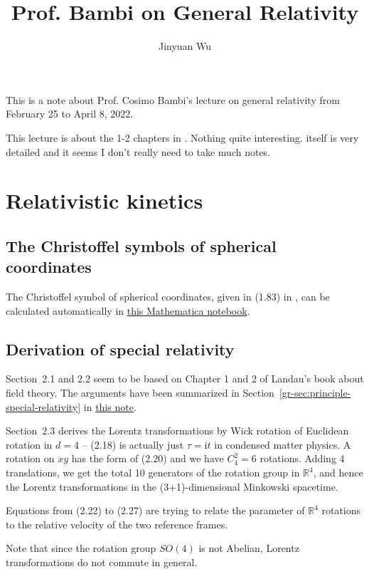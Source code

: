 \documentclass[hyperref, a4paper]{article}
\title{Prof. Bambi on General Relativity}
\author{Jinyuan Wu}
\newcommand*{\ii}{\mathrm{i}}
\newcommand{\grnote}{\href{../relativity/relativistic.pdf}{this note}}
\begin{document}
\maketitle

This is a note about Prof. Cosimo Bambi's lecture on general relativity from February 25 to April 8, 2022.

This lecture is about the 1-2 chapters in \cite{bambi2018introduction}. Nothing quite interesting.
\cite{bambi2018introduction} itself is very detailed and it seems I don't really need to take much notes.

\section{Relativistic kinetics}

\subsection{The Christoffel symbols of spherical coordinates}

The Christoffel symbol of spherical coordinates, given in (1.83) in \cite{bambi2018introduction}, can be 
calculated automatically in \href{spherical-coordinate-differential-geometry.nb}{this Mathematica notebook}.

\subsection{Derivation of special relativity}

Section~2.1 and 2.2 seem to be based on Chapter 1 and 2 of Landau's book about field theory. 
The arguments have been summarized in Section~\ref{gr-sec:principle-special-relativity} in \grnote.

Section~2.3 derives the Lorentz transformations by Wick rotation of Euclidean rotation in $d = 4$
-- (2.18) is actually just $\tau = \ii t$ in condensed matter physics.
A rotation on $xy$ has the form of (2.20) and we have $C_4^2 = 6$ rotations. Adding 4 translations,
we get the total 10 generators of the rotation group in $\mathbb{R}^4$, and hence the Lorentz transformations
in the (3+1)-dimensional Minkowski spacetime.

Equations from (2.22) to (2.27) are trying to relate the parameter of $\mathbb{R}^4$ rotations to the relative 
velocity of the two reference frames.

Note that since the rotation group $SO(4)$ is not Abelian, Lorentz transformations do not commute in general. 
\end{document}
